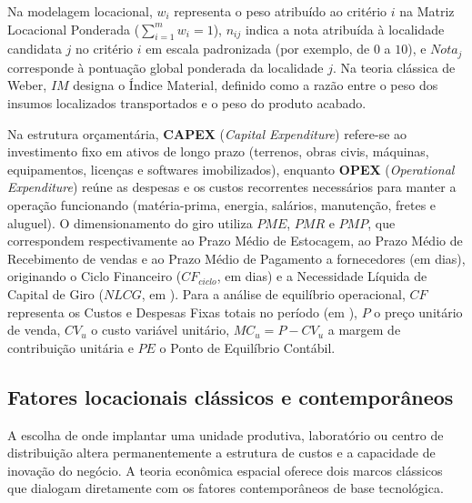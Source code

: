 \begin{boxSimbolo}
Na modelagem locacional, $w_i$ representa o peso atribuído ao critério $i$ na Matriz Locacional Ponderada ($\sum_{i=1}^{m} w_i = 1$), $n_{ij}$ indica a nota atribuída à localidade candidata $j$ no critério $i$ em escala padronizada (por exemplo, de $0$ a $10$), e $Nota_j$ corresponde à pontuação global ponderada da localidade $j$. Na teoria clássica de Weber, $IM$ designa o Índice Material, definido como a razão entre o peso dos insumos localizados transportados e o peso do produto acabado.

Na estrutura orçamentária, \textbf{CAPEX} (\textit{Capital Expenditure}) refere-se ao investimento fixo em ativos de longo prazo (terrenos, obras civis, máquinas, equipamentos, licenças e softwares imobilizados), enquanto \textbf{OPEX} (\textit{Operational Expenditure}) reúne as despesas e os custos recorrentes necessários para manter a operação funcionando (matéria-prima, energia, salários, manutenção, fretes e aluguel). O dimensionamento do giro utiliza $PME$, $PMR$ e $PMP$, que correspondem respectivamente ao Prazo Médio de Estocagem, ao Prazo Médio de Recebimento de vendas e ao Prazo Médio de Pagamento a fornecedores (em dias), originando o Ciclo Financeiro ($CF_{ciclo}$, em dias) e a Necessidade Líquida de Capital de Giro ($NLCG$, em \reais{}). Para a análise de equilíbrio operacional, $CF$ representa os Custos e Despesas Fixas totais no período (em \reais{}), $P$ o preço unitário de venda, $CV_u$ o custo variável unitário, $MC_u = P - CV_u$ a margem de contribuição unitária e $PE$ o Ponto de Equilíbrio Contábil.
\end{boxSimbolo}

\subsection{Fatores locacionais clássicos e contemporâneos}

A escolha de onde implantar uma unidade produtiva, laboratório ou centro de distribuição altera permanentemente a estrutura de custos e a capacidade de inovação do negócio. A teoria econômica espacial oferece dois marcos clássicos que dialogam diretamente com os fatores contemporâneos de base tecnológica.

